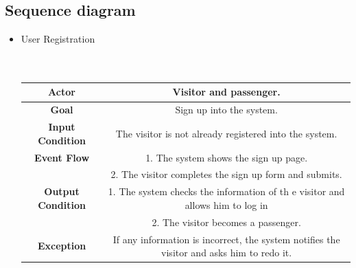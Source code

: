 \documentclass[18pt,oneside,a4paper, titlepage]{article}
\begin{document}
	\subsection{Sequence diagram}
	\begin{itemize}
		\item User Registration
		\\ \\ \\
		\begin{center}
			\centering
			
			\begin{tabular}{| c| c|}
				\hline \textbf{Actor} &  Visitor and passenger.\\
				\hline \textbf{Goal} & Sign up into the system.\\
				\hline \textbf{Input Condition} & The visitor is not already registered into the system. \\
				\hline \textbf{Event Flow} & 1.	The system shows the sign up page.\\
				& 2. The visitor completes the sign up form and submits.	\\
				\hline \textbf{Output Condition} & 1. The system checks the information  of th e visitor and allows him to log in\\
				& 2. The visitor becomes a passenger.\\
				\hline \textbf{Exception} & If any information is incorrect, the system notifies the visitor and asks him to redo it.\\
				\hline
			\end{tabular}
		\end{center}
		
		\newpage
		

\end{itemize}
\end{document}
